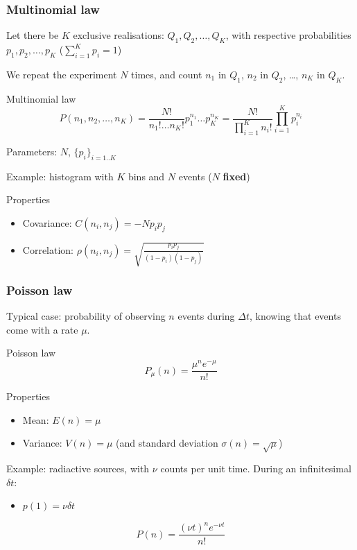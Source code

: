 \documentclass[9pt]{beamer}
\begin{document}
\begin{frame}
 \frametitle{Multinomial law}
 
 Let there be $K$ exclusive realisations: $Q_1, Q_2, \dots, Q_K$, with respective probabilities $p_1, p_2, \dots, p_K$ ($\sum_{i=1}^K p_i = 1$)
 
 We repeat the experiment $N$ times, and count $n_1$ in $Q_1$, $n_2$ in $Q_2$, \dots, $n_K$ in $Q_K$.
 
 \begin{block}{Multinomial law}
  $$P(n_1,n_2,\dots,n_K) = \frac{N!}{n_1! \dots n_K!} p_1^{n_1} \dots p_K^{n_K} = \frac{N!}{\prod_{i=1}^{K} n_i!} \prod_{i=1}^K p_i^{n_i}$$
  
  Parameters: $N$, $\{p_i\}_{i=1..K}$
 \end{block}
 
 Example: histogram with $K$ bins and $N$ events ($N$ \textbf{fixed})

 \begin{block}{Properties}
  \begin{itemize}
   \item Covariance: $C(n_i,n_j) = -N p_i p_j$
   \item Correlation: $\rho (n_i,n_j) = \sqrt{\frac{p_i p_j}{(1-p_i)(1-p_j)}}$
  \end{itemize}
 \end{block}

\end{frame}

\begin{frame}
 \frametitle{Poisson law}
 
 Typical case: probability of observing $n$ events during $\Delta t$, knowing that events come with a rate $\mu$. 
 
 \begin{block}{Poisson law}
  $$P_\mu(n) = \frac{\mu^n e^{-\mu}}{n!}$$
 \end{block}
 
 \begin{block}{Properties}
  \begin{itemize}
   \item Mean: $E(n) = \mu$
   \item Variance: $V(n) = \mu$ (and standard deviation $\sigma(n) = \sqrt{\mu}$)
  \end{itemize}
 \end{block}

 Example: radiactive sources, with $\nu$ counts per unit time. During an infinitesimal $\delta t$:
 
 \begin{itemize}
  \item $p(1) = \nu \delta t$ 
 \end{itemize}
 
 $$P(n) = \frac{(\nu t)^n e^{-\nu t}}{n!}$$


\end{frame}
\end{document}
